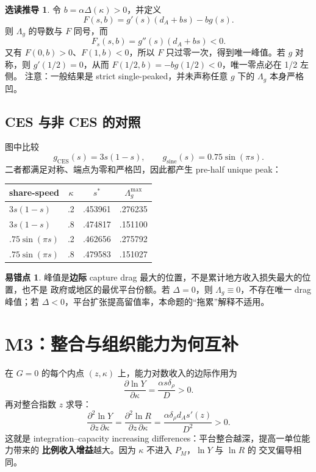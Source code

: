 \documentclass[UTF8,11pt,scheme=chinese,fontset=fandol]{ctexart}
\theoremstyle{definition}
\newtheorem{commonerror}{易错点}[section]
\newtheorem{optionalmath}{选读推导}[section]
\begin{document}
\begin{optionalmath}
令 \(b=\alpha\Delta(\kappa)>0\)，并定义
\[
F(s,b)=g'(s)(d_A+bs)-bg(s).
\]
则 \(\Lambda_g\) 的导数与 \(F\) 同号，而
\[
F_s(s,b)=g''(s)(d_A+bs)<0.
\]
又有 \(F(0,b)>0\)、\(F(1,b)<0\)，所以 \(F\) 只过零一次，得到唯一峰值。若 \(g\)
对称，则 \(g'(1/2)=0\)，从而 \(F(1/2,b)=-bg(1/2)<0\)，唯一零点必在 1/2 左侧。
注意：一般结果是 strict single-peaked，并未声称任意 \(g\) 下的 \(\Lambda_g\) 本身严格凹。
\end{optionalmath}

\subsection{CES 与非 CES 的对照}

图中比较
\[
g_{\mathrm{CES}}(s)=3s(1-s),
\qquad
g_{\mathrm{sine}}(s)=0.75\sin(\pi s).
\]
二者都满足对称、端点为零和严格凹，因此都产生 pre-half unique peak：
\begin{center}
\small
\begin{tabular}{lccc}
\toprule
share-speed & \(\kappa\) & \(s^*\) & \(\Lambda_g^{\max}\) \\
\midrule
\(3s(1-s)\) & .2 & .453961 & .276235 \\
\(3s(1-s)\) & .8 & .474817 & .151100 \\
\(.75\sin(\pi s)\) & .2 & .462656 & .275792 \\
\(.75\sin(\pi s)\) & .8 & .479583 & .151027 \\
\bottomrule
\end{tabular}
\end{center}

\begin{commonerror}
峰值是\textbf{边际} capture drag 最大的位置，不是累计地方收入损失最大的位置，也不是
政府或地区的最优平台份额。若 \(\Delta=0\)，则 \(\Lambda_g\equiv0\)，不存在唯一 drag
峰值；若 \(\Delta<0\)，平台扩张提高留值率，本命题的“拖累”解释不适用。
\end{commonerror}

\section{M3：整合与组织能力为何互补}

在 \(G=0\) 的每个内点 \((z,\kappa)\) 上，能力对数收入的边际作用为
\[
\frac{\partial\ln Y}{\partial\kappa}
=\frac{\alpha s\delta_\rho}{D}>0.
\]
再对整合指数 \(z\) 求导：
\[
\boxed{
\frac{\partial^2\ln Y}{\partial z\,\partial\kappa}
=\frac{\partial^2\ln R}{\partial z\,\partial\kappa}
=\frac{\alpha\delta_\rho d_A s'(z)}{D^2}>0.}
\]
这就是 integration--capacity increasing differences：平台整合越深，提高一单位能力带来的
\textbf{比例收入增益}越大。因为 \(\kappa\) 不进入 \(P_M\)，\(\ln Y\) 与 \(\ln R\) 的
交叉偏导相同。
\end{document}
